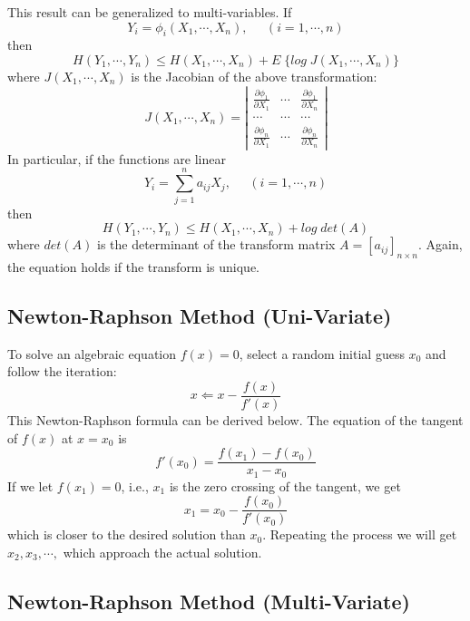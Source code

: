 This result can be generalized to multi-variables. If
\[	Y_i=\phi_i(X_1,\cdots,X_n),\;\;\;\;\;(i=1,\cdots,n) \]
then
\[ H(Y_1,\cdots,Y_n) \le H(X_1,\cdots,X_n)+E\;\{ log\;J(X_1,\cdots,X_n)\} \]
where $J(X_1,\cdots,X_n)$ is the Jacobian of the above transformation:
\[	J(X_1,\cdots,X_n)=\left| \begin{array}{ccc}
\frac{\partial \phi_1}{\partial X_1} & \cdots &\frac{\partial \phi_1}{\partial X_n} \\
\cdots & \cdots & \cdots \\
\frac{\partial \phi_n}{\partial X_1} & \cdots &\frac{\partial \phi_n}{\partial X_n}
\end{array} \right| \]
In particular, if the functions are linear
\[	Y_i=\sum_{j=1}^n a_{ij} X_j,\;\;\;\;\;(i=1,\cdots,n) \]
then
\[ H(Y_1,\cdots,Y_n) \le H(X_1,\cdots,X_n)+log\;det(A)	\]
where $det(A)$ is the determinant of the transform matrix
$A=[a_{ij}]_{n\times n}$. Again, the equation holds if the transform is unique.


\subsection*{Newton-Raphson Method (Uni-Variate)}

To solve an algebraic equation $f(x)=0$, select a random initial guess $x_0$
and follow the iteration:
\[	x \Leftarrow x-\frac{f(x)}{f'(x)}	\]
This Newton-Raphson formula can be derived below. The equation of the tangent
of $f(x)$ at $x=x_0$ is
\[	f'(x_0) = \frac{f(x_1)-f(x_0)}{x_1-x_0}	\]
If we let $f(x_1)=0$, i.e., $x_1$ is the zero crossing of the tangent, we get
\[	x_1=x_0-\frac{f(x_0)}{f'(x_0)}	\]
which is closer to the desired solution than $x_0$. Repeating the process we
will get $x_2, x_3, \cdots, $ which approach the actual solution.


\subsection*{Newton-Raphson Method (Multi-Variate)}

